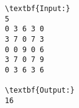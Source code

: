 \begin{verbatim}
\textbf{Input:}
5
0 3 6 3 0 
3 7 0 7 3 
0 0 9 0 6 
3 7 0 7 9 
0 3 6 3 6

\textbf{Output:}
16
\end{verbatim}